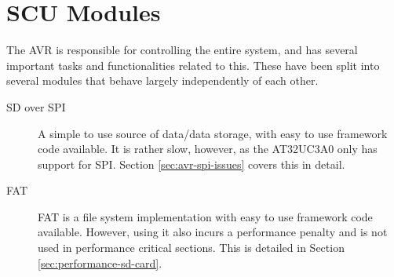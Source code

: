 \section{SCU Modules}
 

The AVR is responsible for controlling the entire system, and has several
important tasks and functionalities related to this. These have been split
into several modules that behave largely independently of each other.
\begin{description}

\item[SD over SPI] A simple to use source of data/data storage, with easy to use
  framework code available. It is rather slow, however, as the AT32UC3A0 only
  has support for SPI. Section \ref{sec:avr-spi-issues} covers this in detail.


\item[FAT] FAT is a file system implementation with easy to use framework
  code available. However, using it also incurs a performance penalty and is not
  used in performance critical sections. This is detailed in Section
  \ref{sec:performance-sd-card}.



\end{description}
